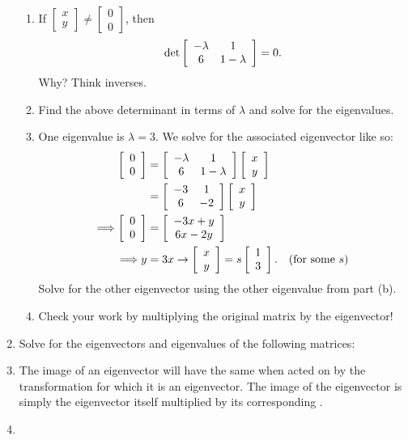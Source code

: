 \documentclass[../textbook.tex]{subfiles}
\begin{document}
\begin{enumerate}
\begin{enumerate}
\item If $\left[\begin{array}{c} x \\ y \end{array}\right]\neq\left[\begin{array}{c} 0 \\ 0 \end{array}\right]$, then $$\det \left[\begin{array}{cc} -\lambda & 1 \\ 6 & 1-\lambda \end{array}\right]=0.$$ Why? Think inverses.
\item Find the above determinant in terms of $\lambda$ and solve for the eigenvalues.
\item One eigenvalue is $\lambda=3$. We solve for the associated eigenvector like so:
\begin{align*}
\left[\begin{array}{c} 0 \\ 0 \end{array}\right] &= \left[\begin{array}{cc} -\lambda & 1 \\ 6 & 1-\lambda \end{array}\right]\left[\begin{array}{c} x \\ y \end{array}\right] \\
&= \left[\begin{array}{cc} -3 & 1 \\ 6 & -2 \end{array}\right]\left[\begin{array}{c} x \\ y \end{array}\right] \\
\Longrightarrow \left[\begin{array}{c} 0 \\ 0 \end{array}\right] &= \left[\begin{array}{c} -3x+y \\ 6x-2y \end{array}\right] \\
\Longrightarrow y&=3x \rightarrow \left[\begin{array}{c} x \\ y \end{array}\right]=s\left[\begin{array}{c} 1 \\ 3 \end{array}\right].\quad \text{(for some }s\text{)}
\end{align*}
Solve for the other eigenvector using the other eigenvalue from part (b).
\item Check your work by multiplying the original matrix by the eigenvector!
\end{enumerate}
\item Solve for the eigenvectors and eigenvalues of the following matrices:
\begin{enumerate}
\end{enumerate}
\item The image of an eigenvector will have the same \underline{\phantom{egg}} when acted on by the transformation \underline{\phantom{egg}} for which it is an eigenvector. The image of the eigenvector is simply the eigenvector itself multiplied by its corresponding \underline{\phantom{egg}}.
\item \begin{enumerate}

\end{enumerate}
\end{enumerate}
\end{document}
